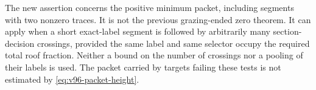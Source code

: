 The new assertion concerns the positive minimum packet, including
segments with two nonzero traces. It is not the previous grazing-ended
zero theorem. It can apply when a short exact-label segment is followed
by arbitrarily many section-decision crossings, provided the same label
and same selector occupy the required total roof fraction. Neither a
bound on the number of crossings nor a pooling of their labels is used.
The packet carried by targets failing these tests is not estimated by
\eqref{eq:v96-packet-height}.
